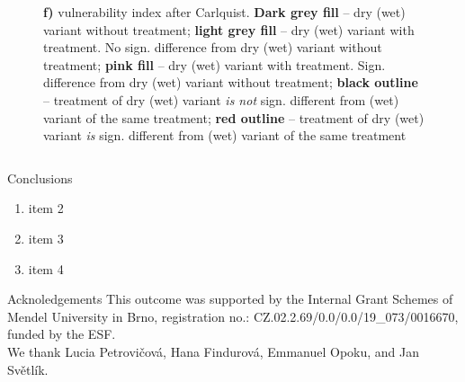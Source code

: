 \documentclass[final]{beamer}
\newlength{\sepwidth}
\newlength{\colwidth}
\newcommand{\separatorcolumn}{\begin{column}{\sepwidth}\end{column}}
\begin{document}
\begin{frame}[t]
\begin{columns}[t]
\begin{column}{\colwidth}
\begin{figure}
{                \textbf{f)} vulnerability index after Carlquist.
                \textbf{Dark grey fill} -- dry (wet) variant without treatment; \textbf{light grey fill} -- dry (wet) variant with treatment. No sign. difference from dry (wet) variant without treatment; \textbf{pink fill} -- dry (wet) variant with treatment. Sign. difference from dry (wet) variant without treatment; \textbf{black outline} -- treatment of dry (wet) variant \emph{is not} sign. different from (wet) variant of the same treatment; \textbf{red outline} -- treatment of dry (wet) variant \emph{is} sign. different from (wet) variant of the same treatment
            }
            \label{fig:xmg}
        \end{figure}

\end{column}
\end{columns}

\begin{columns}[c]
\begin{column}{0.96\paperwidth}
\begin{block}{Conclusions}
    \begin{enumerate}
        \item item 2
        \item item 3
        \item item 4
    \end{enumerate}


\end{block}

\begin{block}{Acknoledgements}
\small \centering
    This outcome was supported by the Internal Grant Schemes of Mendel University in Brno, registration no.: CZ.02.2.69/0.0/0.0/19\_073/0016670, funded by the ESF. \\
    We thank Lucia Petrovičová, Hana Findurová, Emmanuel Opoku, and Jan Světlík.
\end{block}

\end{column}
%
%
\end{columns}
\end{frame}
\end{document}
